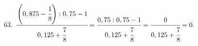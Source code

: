 63. $\cfrac{\left(0,875-\cfrac{1}{8}\right):0,75-1}{0,125+\cfrac{7}{8}}=\cfrac{0,75:0,75-1}{0,125+\cfrac{7}{8}}=\cfrac{0}{0,125+\cfrac{7}{8}}=0.$\\
